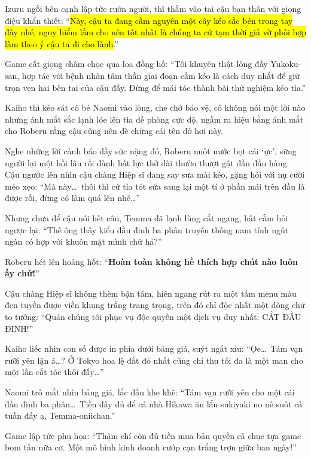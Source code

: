 \documentclass[../main.tex]{subfiles}
\begin{document}
Izuru ngồi bên cạnh lập tức rướn người, thì thầm vào tai cậu bạn thân với giọng điệu khẩn thiết: ``\hl{Này, cậu ta đang cầm nguyên một cây kéo sắc bén trong tay đấy nhé, nguy hiểm lắm cho nên tốt nhất là chúng ta cứ tạm thời giả vờ phối hợp làm theo ý cậu ta đi cho lành.}''


Game cất giọng châm chọc qua loa đồng hồ: ``Tôi khuyên thật lòng đấy Yukoku-san, hợp tác với bệnh nhân tâm thần giai đoạn cầm kéo là cách duy nhất để giữ trọn vẹn hai bên tai của cậu đấy. Đừng để mái tóc thành bãi thử nghiệm kéo tỉa.''

Kaiho thì kéo sát cô bé Naomi vào lòng, che chở bảo vệ, cô không nói một lời nào nhưng ánh mắt sắc lạnh lóe lên tia đề phòng cực độ, ngầm ra hiệu bằng ánh mắt cho Roberu rằng cậu cũng nên dè chừng cái tên dở hơi này.

Nghe những lời cảnh báo đầy sức nặng đó, Roberu nuốt nước bọt cái `ực', sững người lại một hồi lâu rồi đành bất lực thở dài thườn thượt gật đầu đầu hàng. Cậu ngước lên nhìn cậu chàng Hiệp sĩ đang say sưa mài kéo, gặng hỏi với nụ cười méo xẹo: ``Mà này\dots\ thôi thì cứ tỉa tót sửa sang lại một tí ở phần mái trên đầu là được rồi, đừng có làm quá lên nhé\dots''

Nhưng chưa để cậu nói hết câu, Temma đã lạnh lùng cắt ngang, hất cằm hỏi ngược lại: ``Thế ông thấy kiểu đầu đinh ba phân truyền thống nam tính ngút ngàn có hợp với khuôn mặt mình chứ hả?''

Roberu hét lên hoảng hốt: ``\textbf{Hoàn toàn không hề thích hợp chút nào luôn ấy chứ!}''

Cậu chàng Hiệp sĩ không thèm bận tâm, hiên ngang rút ra một tấm menu màu đen tuyền được viền khung trắng trang trọng, trên đó chỉ độc nhất một dòng chữ to tướng: ``Quán chúng tôi phục vụ độc quyền một dịch vụ duy nhất: CẮT ĐẦU ĐINH!''


Kaiho liếc nhìn con số được in phía dưới bảng giá, suýt ngất xỉu: ``Ọe\dots\ Tám vạn rưỡi yên lận á\dots? Ở Tokyo hoa lệ đắt đỏ nhất cũng chỉ thu tối đa là một man cho một lần cắt tóc thôi đấy\dots''

Naomi trố mắt nhìn bảng giá, lắc đầu khe khẽ: ``Tám vạn rưỡi yên cho một cái đầu đinh ba phân\dots\ Tiền đấy đủ để cả nhà Hikawa ăn lẩu sukiyaki no nê suốt cả tuần đấy ạ, Temma-oniichan.''

Game lập tức phụ họa: ``Thậm chí còn đủ tiền mua bản quyền cả chục tựa game bom tấn nữa cơ. Một mô hình kinh doanh cướp cạn trắng trợn giữa ban ngày!''
\end{document}
